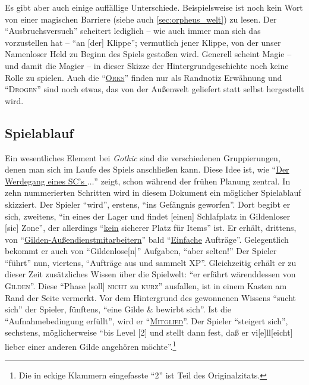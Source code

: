 \documentclass[a5paper,pagesize,numbers=noenddot]{scrbook}
\begin{document}
Es gibt aber auch einige auffällige Unterschiede.
Beispielsweise ist noch kein Wort von einer magischen Barriere (siehe auch \autoref{sec:orpheus_welt}) zu lesen.
Der \enquote{Ausbruchsversuch} scheitert lediglich -- wie auch immer man sich das vorzustellen hat -- \enquote{an [der] Klippe}; vermutlich jener Klippe, von der unser Namenloser Held zu Beginn des Spiels gestoßen wird.
Generell scheint Magie -- und damit die Magier -- in dieser Skizze der Hintergrundgeschichte noch keine Rolle zu spielen.
Auch die \enquote{\textsc{\uline{Orks}}} finden nur als Randnotiz Erwähnung und \enquote{\textsc{Drogen}} sind noch etwas, das von der Außenwelt geliefert statt selbst hergestellt wird.


\subsection{Spielablauf}\label{sec:orpheus_geschichte_spielablauf}
Ein wesentliches Element bei \textit{Gothic} sind die verschiedenen Gruppierungen, denen man sich im Laufe des Spiels anschließen kann.
Diese Idee ist, wie \enquote{\uline{Der Werdegang eines SC's $\ldots$}} zeigt, schon während der frühen Planung zentral.
In zehn nummerierten Schritten wird in diesem Dokument ein möglicher Spiel\-ablauf skizziert.
Der Spieler \enquote{wird}, erstens, \enquote{ins Gefängnis geworfen}.
Dort begibt er sich, zweitens, \enquote{in eines der Lager und findet [einen] Schlafplatz in Gildenloser [sic] Zone}, der allerdings \enquote{\uline{kein} sicherer Platz für Items} ist.
Er erhält, drittens, von \enquote{\uline{Gilden-Außendienstmitarbeitern}} bald \enquote{\uline{Einfache} Aufträge}.
Gelegentlich bekommt er auch von \enquote{Gildenlose[n]} Aufgaben, \enquote{aber selten!}
Der Spieler \enquote{führt} nun, viertens, \enquote{Aufträge aus und sammelt XP}.
Gleichzeitig erhält er zu dieser Zeit zusätzliches Wissen über die Spielwelt: \enquote{er erfährt wärenddessen von \textsc{Gilden}}.
Diese \enquote{Phase [soll] \textsc{nicht} zu \textsc{kurz}} ausfallen, ist in einem Kasten am Rand der Seite vermerkt.
Vor dem Hintergrund des gewonnenen Wissens \enquote{sucht sich} der Spieler, fünftens, \enquote{eine Gilde \& bewirbt sich}.
Ist die \enquote{Aufnahmebedingung erfüllt}, wird er \enquote{\textsc{\uline{Mitglied}}}.
Der Spieler \enquote{steigert sich}, sechstens, möglicherweise \enquote{bis Level [2] und stellt dann fest, daß er vi[e]ll[eicht] lieber einer anderen Gilde angehören möchte}.\footnote{Die in eckige Klammern eingefasste \enquote{2} ist Teil des Originalzitats.}
\end{document}
